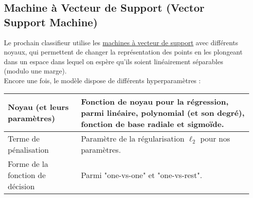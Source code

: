 \subsection{Machine à Vecteur de Support (Vector Support Machine)}

Le prochain classifieur utilise les \href{https://scikit-learn.org/stable/modules/generated/sklearn.svm.SVC.html}{machines à vecteur de support} avec différents noyaux, qui permettent de changer la représentation des points en les plongeant dans un espace dans lequel on espère qu'ils soient linéairement séparables (modulo une marge).\\

Encore une fois, le modèle dispose de différents hyperparamètres :

\noindent
\begin{tabularx}{\textwidth}{|X|X|}
    \hline
    Noyau (et leurs paramètres)  & Fonction de noyau pour la régression, parmi linéaire, polynomial (et son degré), fonction de base radiale et sigmoïde.\\\hline
    Terme de pénalisation  & Paramètre de la régularisation $\ell_2$ pour nos paramètres.\\\hline
    Forme de la fonction de décision  & Parmi "one-vs-one" et "one-vs-rest".\\\hline
\end{tabularx}